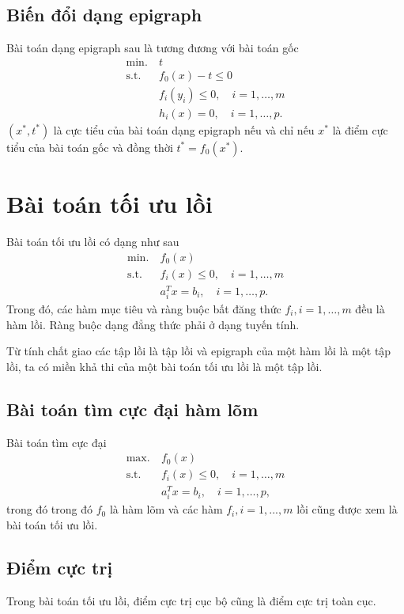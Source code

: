 \documentclass{book}
\begin{document}
\subsection*{Biến đổi dạng epigraph}
Bài toán dạng epigraph sau là tương đương với bài toán gốc
\begin{align*}
\mathrm{min.}~ & t\\
\mathrm{s.t.}~ & f_0(x) - t \leq 0 \\
			& f_i(y_i) \leq 0,  \quad i = 1, \ldots, m \\
			& h_i(x) = 0, 		\quad i = 1, \ldots, p.
\end{align*}
$(x^*, t^*)$ là cực tiểu của bài toán dạng epigraph nếu và chỉ nếu $x^*$ là điểm cực tiểu của bài toán gốc và đồng thời $t^* = f_0(x^*)$.

\section{Bài toán tối ưu lồi}

Bài toán tối ưu lồi có dạng như sau
\begin{align*}
\mathrm{min.}~ & f_0(x)\\
\mathrm{s.t.}~ & f_i(x) \leq 0, \quad i = 1, \ldots, m \\
			& a_i^T x = b_i, 	\quad i = 1, \ldots, p.
\end{align*}
Trong đó, các hàm mục tiêu và ràng buộc bất đăng thức $f_i, i=1, \ldots, m$ đều là hàm lồi. 
Ràng buộc dạng đẳng thức phải ở dạng tuyến tính.

Từ tính chất giao các tập lồi là tập lồi và epigraph của một hàm lồi là một tập lồi, ta có miền khả thi của một bài toán tối ưu lồi là một tập lồi.

\subsection{Bài toán tìm cực đại hàm lõm}
Bài toán tìm cực đại 
\begin{align}
\mathrm{max.}~ & f_0(x) \label{eq:convprob_obj}\\
\mathrm{s.t.}~ & f_i(x) \leq 0, \quad i = 1, \ldots, m \label{eq:convprob_incon}\\
			& a_i^T x = b_i, 	\quad i = 1, \ldots, p, \label{eq:convprob_affcon}
\end{align}
trong đó trong đó $f_0$ là hàm lõm và các hàm $f_i, i=1,...,m$ lồi cũng được xem là bài toán tối ưu lồi.

\subsection{Điểm cực trị}
Trong bài toán tối ưu lồi, điểm cực trị cục bộ cũng là điểm cực trị toàn cục.
\end{document}
